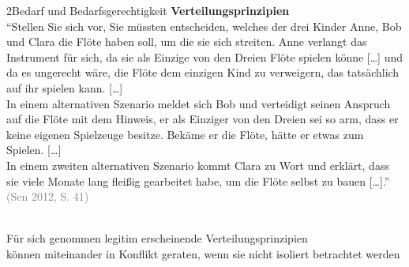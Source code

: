 \documentclass[xcolor=table,9pt,aspectratio=169]{beamer}
\begin{document}
\begin{frame}{\vspace*{10mm}2\hspace*{1em}Bedarf und Bedarfsgerechtigkeit}
\textbf{Verteilungsprinzipien}\\
\medskip
\enquote{Stellen Sie sich vor, Sie müssten entscheiden, welches der drei Kinder Anne, Bob und Clara die Flöte haben soll, um die sie sich streiten. Anne verlangt das Instrument für sich, da sie als Einzige von den Dreien Flöte spielen könne [\ldots] und da es ungerecht wäre, die Flöte dem einzigen Kind zu verweigern, das tatsächlich auf ihr spielen kann. [\ldots]\\
\medskip
In einem alternativen Szenario meldet sich Bob und verteidigt seinen Anspruch auf die Flöte mit dem Hinweis, er als Einziger von den Dreien sei so arm, dass er keine eigenen Spielzeuge besitze. Bekäme er die Flöte, hätte er etwas zum Spielen. [\ldots]\\
\medskip
In einem zweiten alternativen Szenario kommt Clara zu Wort und erklärt, dass sie viele Monate lang fleißig gearbeitet habe, um die Flöte selbst zu bauen [\ldots].} \textcolor{gray}{(Sen 2012, S. 41)}\\
\begin{center}
   \\
   {\color{blue2} \fontsize{10}{10}\selectfont%
   Für sich genommen legitim erscheinende Verteilungsprinzipien\\[0.2ex]
   können miteinander in Konflikt geraten, wenn sie nicht isoliert betrachtet werden}
\end{center}
\end{frame}
\end{document}
